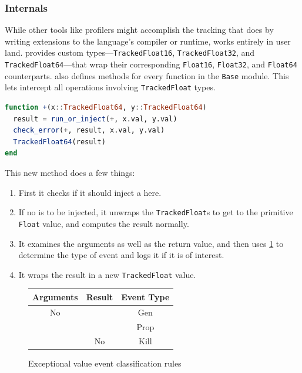 \documentclass{juliacon}
\begin{document}
\subsubsection{\FT{} Internals}

While other tools like profilers might accomplish the tracking that \FT{} does by writing extensions to the language's compiler or runtime, \FT{} works entirely in user land.
\FT{} provides custom types---\texttt{TrackedFloat16}, \texttt{TrackedFloat32}, and \texttt{TrackedFloat64}---that wrap their corresponding \texttt{Float16}, \texttt{Float32}, and \texttt{Float64} counterparts.
\FT{} also defines methods for every function in the \texttt{Base} module.
This lets \FT{} intercept all \fp{} operations involving \texttt{TrackedFloat} types.

\begin{lstlisting}[language = Julia]
function +(x::TrackedFloat64, y::TrackedFloat64)
  result = run_or_inject(+, x.val, y.val)
  check_error(+, result, x.val, y.val)
  TrackedFloat64(result)
end
\end{lstlisting}

This new method does a few things:

\begin{enumerate}
\item First it checks if it should inject a \NaN{} here.
\item If no \NaN{} is to be injected, it unwraps the \texttt{TrackedFloat}s to get to the primitive \texttt{Float} value, and computes the result normally.
\item It examines the arguments as well as the return value, and then uses \cref{fig:lifetime-class} to determine the type of event and logs it if it is of interest.
\item It wraps the result in a new \texttt{TrackedFloat} value.
\end{enumerate}

\begin{figure}[h]
  \centering
  \begin{tabular}{ccc}
    Arguments & Result & Event Type \\
    \hline
    No \NaN{} & \NaN{} & Gen \\
    \NaN{} & \NaN{} & Prop \\
    \NaN{} & No \NaN{} & Kill \\
  \end{tabular}
  \label{fig:lifetime-class}
  \caption{Exceptional value event classification rules}
\end{figure}
\end{document}
